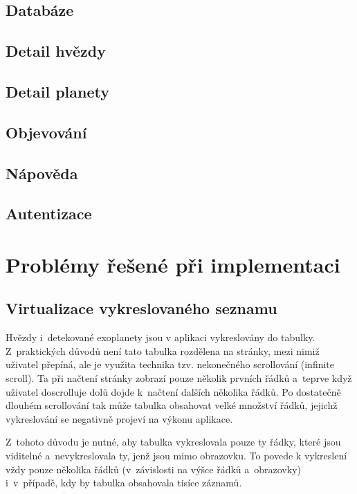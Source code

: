 \documentclass[a4paper,12pt]{article}
\begin{document}
{{\subsection{Databáze}

\subsection{Detail hvězdy}

\subsection{Detail planety}

\subsection{Objevování}

\subsection{Nápověda}

\subsection{Autentizace}

\section{Problémy řešené při implementaci}

\subsection{Virtualizace vykreslovaného seznamu}

Hvězdy i~detekované exoplanety jsou v aplikaci vykreslovány do tabulky. Z~praktických důvodů není tato tabulka rozdělena na stránky, mezi nimiž uživatel přepíná, ale je využita technika tzv. nekonečného scrollování (infinite scroll). Ta při načtení stránky zobrazí pouze několik prvních řádků a~teprve když uživatel doscrolluje dolů dojde k~načtení dalších několika řádků. Po dostatečně dlouhém scrollování tak může tabulka obsahovat velké množství řádků, jejichž vykreslování se negativně projeví na výkonu aplikace.

Z~tohoto důvodu je nutné, aby tabulka vykreslovala pouze ty řádky, které jsou viditelné a~nevykreslovala ty, jenž jsou mimo obrazovku. To povede k vykreslení vždy pouze několika řádků (v~závislosti na výšce řádků a~obrazovky) i~v~případě, kdy by tabulka obsahovala tisíce záznamů.


}}
\end{document}
